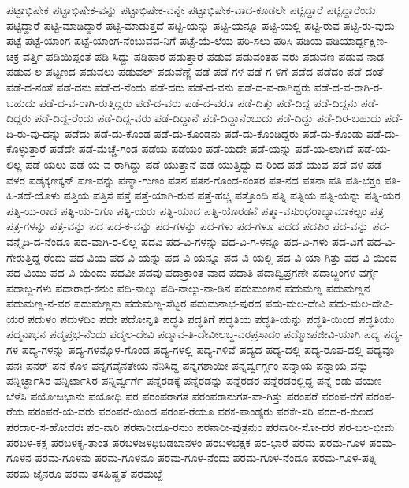 {ಪಟ್ಟಾಭಿಷೇಕ
ಪಟ್ಟಾಭಿಷೇಕ-ವನ್ನು
ಪಟ್ಟಾಭಿಷೇಕ-ವನ್ನೇ
ಪಟ್ಟಾಭಿಷೇಕ-ವಾದ-ಕೂಡಲೇ
ಪಟ್ಟಿದ್ದಾರೆ
ಪಟ್ಟಿದ್ದಾರೆಂದು
ಪಟ್ಟಿದ್ದಾರೆೆ
ಪಟ್ಟಿ-ಮಾಡಿದ್ದಾರೆ
ಪಟ್ಟಿ-ಮಾಡುತ್ತದೆ
ಪಟ್ಟಿ-ಯನ್ನು
ಪಟ್ಟಿ-ಯನ್ನೂ
ಪಟ್ಟಿ-ಯಲ್ಲಿ
ಪಟ್ಟಿ-ರುವ
ಪಟ್ಟಿ-ರು-ವುದು
ಪಟ್ಟೆ
ಪಟ್ಟೆ-ಯಾಂಗ
ಪಟ್ಟೆ-ಯಾಂಗ-ನೆಂಬುವವ-ನಿಗೆ
ಪಟ್ಟೆ-ಯೆ-ಲೆಯ
ಪಠಿ-ಸಲು
ಪಠಿಸಿ
ಪಡಿಯ
ಪಡಿಯಾರ್ದ್ದಕ್ಷಿಣ-ಚಕ್ರ-ವರ್ತ್ತಿ
ಪಡಿಯಿಪ್ಪಂತೆ
ಪಡಿ-ಸಿದ್ದು
ಪಡಿಹಾರ
ಪಡುತ್ತಾರೆ
ಪಡುವ
ಪಡುವಂತಹ-ವರು
ಪಡುವಣ
ಪಡುವ-ನಾಡ
ಪಡುವ-ಲ-ಪಟ್ಟಣದ
ಪಡುವಲು
ಪಡುವಲ್
ಪಡುವೆಣ್ಣೆ
ಪಡೆ
ಪಡೆ-ಗಳ
ಪಡೆ-ಗ-ಳಿಗೆ
ಪಡೆದ
ಪಡೆದಂ
ಪಡೆ-ದಂತೆ
ಪಡೆ-ದ-ನಂತೆ
ಪಡೆ-ದನು
ಪಡೆ-ದ-ನೆಂದು
ಪಡೆ-ದರು
ಪಡೆ-ದ-ವನು
ಪಡೆ-ದ-ವ-ರಾಗಿದ್ದರು
ಪಡೆ-ದ-ವ-ರಾಗಿ-ರ-ಬಹುದು
ಪಡೆ-ದ-ವ-ರಾಗಿ-ರುತ್ತಿದ್ದರು
ಪಡೆ-ದ-ವರು
ಪಡೆ-ದ-ವರೂ
ಪಡೆ-ದಿತ್ತು
ಪಡೆ-ದಿದ್ದ
ಪಡೆ-ದಿದ್ದನು
ಪಡೆ-ದಿದ್ದರು
ಪಡೆ-ದಿದ್ದ-ರೆಂದು
ಪಡೆ-ದಿದ್ದ-ವರು
ಪಡೆ-ದಿದ್ದಾನೆ
ಪಡೆ-ದಿದ್ದಾನೆಂಬುದು
ಪಡೆ-ದಿದ್ದು
ಪಡೆ-ದಿರ-ಬಹುದು
ಪಡೆ-ದಿ-ರು-ವು-ದನ್ನು
ಪಡೆದು
ಪಡೆ-ದು-ಕೊಂಡ
ಪಡೆ-ದು-ಕೊಂಡನು
ಪಡೆ-ದು-ಕೊಂಡಿದ್ದರು
ಪಡೆ-ದು-ಕೊಂಡು
ಪಡೆ-ದು-ಕೊಳ್ಳುತ್ತಾರೆ
ಪಡೆದೇ
ಪಡೆ-ಮೆಚ್ಚೆ-ಗಂಡ
ಪಡೆಯ
ಪಡೆಯಂ
ಪಡೆ-ಯದೇ
ಪಡೆ-ಯನ್ನು
ಪಡೆ-ಯ-ಲಾಗಿದೆ
ಪಡೆ-ಯ-ಲಿಲ್ಲ
ಪಡೆ-ಯಲು
ಪಡೆ-ಯ-ವ-ರಾಗಿದ್ದು
ಪಡೆ-ಯುತ್ತಾನೆ
ಪಡೆ-ಯುತ್ತಿದ್ದು-ದ-ರಿಂದ
ಪಡೆ-ಯುವ
ಪಡೆ-ವಳ
ಪಡೆ-ವಳರ
ಪಡೈಕ್ಕಣಕ್ಕನ್
ಪಣ-ವನ್ನು
ಪಣ್ಯಾ-ಗುಣಂ
ಪತನ
ಪತನ-ಗೊಂಡ-ನಂತರ
ಪತ-ನದ
ಪತನಾ
ಪತಿ
ಪತಿ-ಭಕ್ತಂ
ಪತಿ-ಹಿ-ತದೆ-ಯೊಳು
ಪತ್ತಿಯ
ಪತ್ತಿಸೆ
ಪತ್ತೆ
ಪತ್ತೆ-ಯಾಗಿ-ರುವ
ಪತ್ತೆ-ಹಚ್ಚಿ
ಪತ್ತೊಂದಿ
ಪತ್ನಿ
ಪತ್ನಿಯ
ಪತ್ನಿ-ಯನ್ನು
ಪತ್ನಿ-ಯರ
ಪತ್ನಿ-ಯ-ರಾದ
ಪತ್ನಿ-ಯ-ರಿಗೂ
ಪತ್ನಿ-ಯರು
ಪತ್ನಿ-ಯಾದ
ಪತ್ನಿ-ಯೊರಡನೆ
ಪತ್ಮಾ-ವಸುಂಧರಾಭ್ಯಾಮಾಕಲ್ಪಂ
ಪತ್ರ
ಪತ್ರ-ಗಳನ್ನು
ಪತ್ರ-ವನ್ನು
ಪದ
ಪದ-ಕ-ವನ್ನು
ಪದ-ಗಳನ್ನು
ಪದ-ಗಳು
ಪದ-ಗಳೂ
ಪದದ
ಪದಪಿಂ
ಪದ-ವನ್ನು
ಪದ-ವನ್ನೈದಿ-ದ-ನೆಂದೂ
ಪದ-ವಾಗಿ-ರ-ಲಿಲ್ಲ
ಪದವಿ
ಪದ-ವಿ-ಗಳನ್ನು
ಪದ-ವಿ-ಗ-ಳನ್ನೂ
ಪದ-ವಿ-ಗಳು
ಪದ-ವಿಗೆ
ಪದ-ವಿ-ಗೇರುತ್ತಿದ್ದ-ರೆಂದು
ಪದ-ವಿಯ
ಪದ-ವಿ-ಯನ್ನು
ಪದ-ವಿ-ಯನ್ನೂ
ಪದ-ವಿ-ಯಲ್ಲಿ
ಪದ-ವಿ-ಯಾ-ಗಿತ್ತು
ಪದ-ವಿ-ಯಿಂದ
ಪದ-ವಿಯು
ಪದ-ವಿ-ಯೆಂದು
ಪದವೀ
ಪದವು
ಪದಾಕ್ರಾಂತ-ವಾದ
ಪದಾತಿ
ಪದಾದ್ವಿಪ್ರಗಣೇ
ಪದಾಬ್ಜಂಗಳ-ವರ್ಗ್ಗೆ
ಪದಾಬ್ಜ-ಗಳು
ಪದಾರಾಧ-ಕನುಂ
ಪದಿ-ನಾಲ್ಕು
ಪದಿ-ನಾಲ್ಕು-ನಾ-ಡಿನ
ಪದುಮಂಣನ
ಪದುಮಣ್ಣ
ಪದುಮಣ್ಣನ
ಪದುಮಣ್ಣ-ನ-ವರ
ಪದುಮಣ್ಣನು
ಪದುಮಣ್ಣ-ಸೆಟ್ಟರ
ಪದುಮನಾಭ-ಪುರದ
ಪದು-ಮಲ-ದೇವಿ
ಪದು-ಮಲ-ದೇವಿ-ಯರ
ಪದುಳಂ
ಪದುಳದಿಂ
ಪದೇ
ಪದೋನ್ನತಿ
ಪದ್ಧತಿ
ಪದ್ಧತಿಗೆ
ಪದ್ಧತಿಯ
ಪದ್ಧತಿ-ಯನ್ನು
ಪದ್ಧತಿ-ಯಿಂದ
ಪದ್ಧತಿಯು
ಪದ್ಮನಾಭನ
ಪದ್ಮಪ್ರಭ-ನೆಂದು
ಪದ್ಮಲ-ದೇವಿ
ಪದ್ಮಾವ-ತಿ-ದೇವೀಲಬ್ಧ-ವರಪ್ರಸಾದಂ
ಪದ್ಮೋಪಜೀವಿ-ಯಾಗಿ
ಪದ್ಯ
ಪದ್ಯ-ಗಳ
ಪದ್ಯ-ಗಳನ್ನು
ಪದ್ಯ-ಗಳನ್ನೊಳ-ಗೊಂಡ
ಪದ್ಯ-ಗಳಲ್ಲಿ
ಪದ್ಯ-ಗಳಿವೆ
ಪದ್ಯದ
ಪದ್ಯ-ದಲ್ಲಿ
ಪದ್ಯ-ರೂಪ-ದಲ್ಲಿ
ಪದ್ಯವೂ
ಪನಃ
ಪನರ್
ಪನೆ-ಕೊಳ
ಪನ್ನಗವೈನತೇಯ-ನೆನಿಸಿದ್ದ
ಪನ್ನಗಶಾಯೀ
ಪನ್ನರ್ವ್ವರ್ಗ್ಗಂ
ಪನ್ನಾಯ
ಪನ್ನಾಯ-ವನ್ನು
ಪನ್ನಿರ್ಚ್ಛಾಸಿರ
ಪನ್ನಿರ್ಛಾಸಿರ
ಪನ್ನಿರ್ವ್ವರ್ಗೆ
ಪನ್ನೆರಡಕ್ಕೆ
ಪನ್ನೆರಡನ್ನು
ಪನ್ನೆರಡರ
ಪನ್ನೆರಡರಲ್ಲಿದ್ದ
ಪನ್ನೆ-ರಡು
ಪಯಣ-ಬೆಳೆಸಿ
ಪಯೋಜಭಾನು
ಪಯೋಧಿ
ಪರ
ಪರಂಪರಾಗತ
ಪರಂಪರಾನುಗತ-ವಾ-ಗಿತ್ತು
ಪರಂಪರೆ
ಪರಂಪ-ರೆಗೆ
ಪರಂಪ-ರೆಯ
ಪರಂಪರೆ-ಯ-ವರು
ಪರಂಪರೆ-ಯಿಂದ
ಪರಂಪ-ರೆಯೂ
ಪರಕ-ಪಾಂಡ್ಯರು
ಪರಕೇ-ಸರಿ
ಪರದ-ರ-ಕುಲದ
ಪರದಾರ-ಸ-ಹೋದರಃ
ಪರ-ನಾರಿ
ಪರನಾರೀದೂ-ರನುಂ
ಪರನಾರೀ-ಪುತ್ರನುಂ
ಪರನಾರೀ-ಸೋ-ದರ
ಪರ-ಬಲ-ಭೀಮ
ಪರಬಳ-ಕಕ್ಷ
ಪರಬಳಕೃ-ತಾಂತ
ಪರಬಳಜಳಧಿಬಡಬಾನಳಂ
ಪರಬಳಭಕ್ಷಕ
ಪರ-ಭಾರೆ
ಪರಮ
ಪರಮ-ಗೂಳ
ಪರಮ-ಗೂಳನ
ಪರಮ-ಗೂಳನು
ಪರಮ-ಗೂಳನೂ
ಪರಮ-ಗೂಳ-ನೆಂದು
ಪರಮ-ಗೂಳ-ನೆಂದೂ
ಪರಮ-ಗೂಳ-ಪತ್ನಿ
ಪರಮ-ಜೈನರೂ
ಪರಮ-ತಸಹಿಷ್ಣತೆ
ಪರಮಬ್ಬೆ
}
